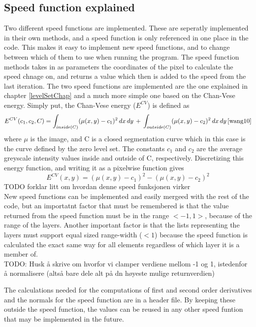 \subsection{Speed function explained}
Two different speed functions are implemented. These are seperatly implemented in their own methods, and a speed function is only referenced in one place in the code. This makes it easy to implement new speed functions, and to change between which of them to use when running the program. The speed function methods takes in as parameters the coordinates of the pixel to calculate the speed chnage on, and returns a value which then is added to the speed from the last iteration. The two speed functions are implemented are the one explained in chapter \ref{levelSetChap} and a much more simple one based on the Chan-Vese energy. Simply put, the Chan-Vese energy ($E^{CV}$) is defined as 
\begin{equation}
E^{CV}(c_1,c_2,C) = \int_{inside(C)} (\mu (x,y) - c_1)^2 \, dx \, dy \, + \, \int_{outside(C)} (\mu (x,y) - c_2)^2 \, dx \, dy \, \cite{wang10} %
\end{equation}
where $\mu$ is the image, and C is a closed segmentation curve which in this case is the curve defined by the zero level set. The constants $c_1$ and $c_2$ are the average greyscale intensity values inside and outside of C, respectively. Discretizing this energy function, and writing it as a pixelwise function gives
\begin{equation}
E^{CV}(x,y) = (\mu (x,y) - c_1)^2 - (\mu (x,y) - c_2)^2
\end{equation}
TODO forklar litt om hvordan denne speed funksjonen virker\\
New speed functions can be implemented and easily mergeed with the rest of the code, but an importatnt factor that must be remembered is that the value returned from the speed function must be in the range $<-1,1>$, because of the range of the layers. Another important factor is that the lists representing the layers must support equal sized range-width ($<1$) because the speed function is calculated the exact same way for all elements regardless of which layer it is a member of. \\
TODO: Husk å skrive om hvorfor vi clamper verdiene mellom -1 og 1, istedenfor å normalisere (altså bare dele alt på dn høyeste mulige returnverdien)

The calculations needed for the computations of first and second order derivatives and the normals for the speed function are in a header file. By keeping these outside the speed function, the values can be reused in any other speed funtion that may be implemented in the future. 

